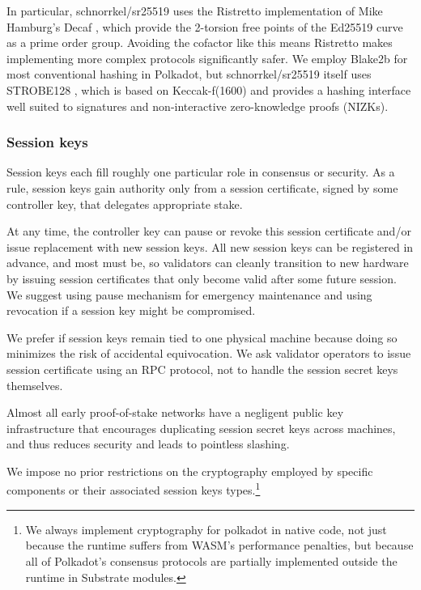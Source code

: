 In particular, schnorrkel/sr25519 uses the Ristretto implementation \cite{Ristretto} of Mike Hamburg's Decaf , which provide the 2-torsion free points of the Ed25519 curve as a prime order group.  Avoiding the cofactor like this means Ristretto makes implementing more complex protocols significantly safer.  We employ Blake2b for most conventional hashing in Polkadot, but schnorrkel/sr25519 itself uses STROBE128 \cite{STROBE}, which is based on Keccak-f(1600) and provides a hashing interface well suited to signatures and non-interactive zero-knowledge proofs (NIZKs).

\subsubsection{Session keys}\label{sec:session_keys}

Session keys each fill roughly one particular role in consensus or security.  As a rule, session keys gain authority only from a session certificate, signed by some controller key, that delegates appropriate stake.  

At any time, the controller key can pause or revoke this session certificate and/or issue replacement with new session keys.  All new session keys can be registered in advance, and most must be, so validators can cleanly transition to new hardware by issuing session certificates that only become valid after some future session.  We suggest using pause mechanism for emergency maintenance and using revocation if a session key might be compromised.  

We prefer if session keys remain tied to one physical machine because doing so minimizes the risk of accidental equivocation.  We ask validator operators to issue session certificate using an RPC protocol, not to handle the session secret keys themselves.  

Almost all early proof-of-stake networks have a negligent public key infrastructure that encourages duplicating session secret keys across machines, and thus reduces security and leads to pointless slashing.

\smallskip

We impose no prior restrictions on the cryptography employed by specific components or their associated session keys types.\footnote{We always implement cryptography for polkadot in native code, not just because the runtime suffers from WASM's performance penalties, but because all of Polkadot's consensus protocols are partially implemented outside the runtime in Substrate modules.}

